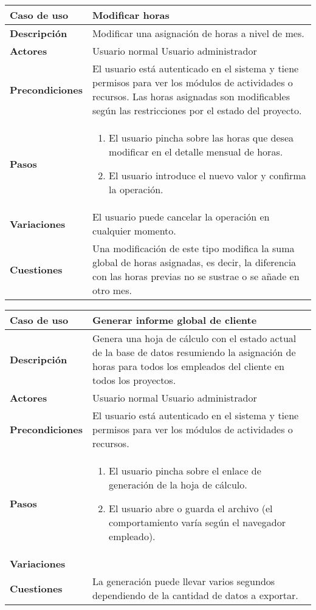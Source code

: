 \begin{tabular}{|p{1.25in}|p{3.65in}|}\hline
\textbf{Caso de uso} & \textbf{Modificar horas}\\\hline\hline
\textbf{Descripción} & Modificar una asignación de horas a nivel de mes.
\\\hline
\textbf{Actores} & Usuario normal \newline Usuario administrador\\\hline
\textbf{Precondiciones} & El usuario está autenticado en el sistema y
tiene permisos para ver los módulos de actividades o recursos. Las horas
asignadas son modificables según las restricciones por el estado del
proyecto. \\\hline
\textbf{Pasos} & 
  \begin{enumerate}
   \item El usuario pincha sobre las horas que desea modificar en el detalle
mensual de horas.
   \item El usuario introduce el nuevo valor y confirma la operación.
  \end{enumerate}
\\\hline
\textbf{Variaciones} & El usuario puede cancelar la operación en
cualquier momento.\\\hline
\textbf{Cuestiones} & Una modificación de este tipo modifica la suma
global de horas asignadas, es decir, la diferencia con las horas previas
no se sustrae o se añade en otro mes.\\\hline
\end{tabular}

\begin{tabular}{|p{1.25in}|p{3.65in}|}\hline
\textbf{Caso de uso} & \textbf{Generar informe global de cliente}\\\hline\hline
\textbf{Descripción} & Genera una hoja de cálculo con el estado actual de la
base de datos resumiendo la asignación de horas para todos los empleados del
cliente en todos los proyectos.
\\\hline
\textbf{Actores} & Usuario normal \newline Usuario administrador\\\hline
\textbf{Precondiciones} & El usuario está autenticado en el sistema y
tiene permisos para ver los módulos de actividades o recursos. \\\hline
\textbf{Pasos} & 
  \begin{enumerate}
   \item El usuario pincha sobre el enlace de generación de la hoja de cálculo.
   \item El usuario abre o guarda el archivo (el comportamiento varía según el
navegador empleado).
  \end{enumerate}
\\\hline
\textbf{Variaciones} & \\\hline
\textbf{Cuestiones} & La generación puede llevar varios segundos
dependiendo de la cantidad de datos a exportar.\\\hline
\end{tabular}


